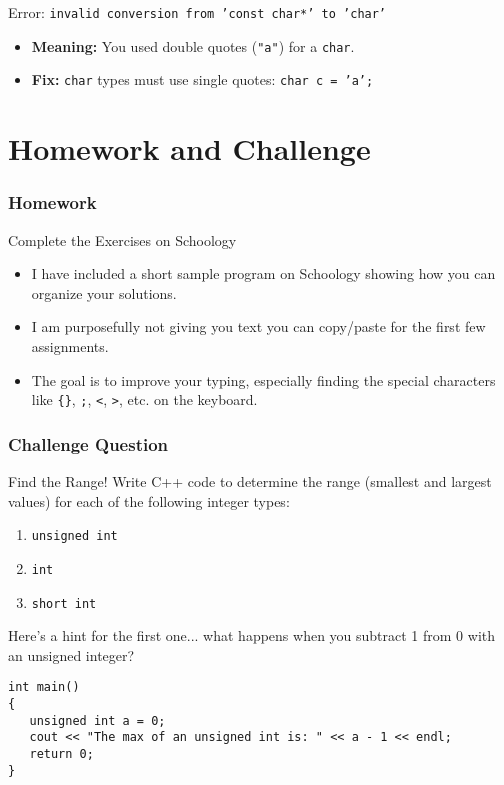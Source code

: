 \documentclass{beamer}
\begin{document}
\begin{frame}
    
\begin{alertblock}{Error: \texttt{invalid conversion from 'const char*' to 'char'}}
\begin{itemize}
    \item \textbf{Meaning:} You used double quotes (\texttt{"a"}) for a \texttt{char}.
    \item \textbf{Fix:} \texttt{char} types must use single quotes: \texttt{char c = 'a';}
\end{itemize}
\end{alertblock}
\end{frame}

\section{Homework and Challenge}

\begin{frame}
\frametitle{Homework}
\begin{block}{Complete the Exercises on Schoology}
\begin{itemize}
    \item I have included a short sample program on Schoology showing how you can organize your solutions.
    \item I am purposefully not giving you text you can copy/paste for the first few assignments.
    \item The goal is to improve your typing, especially finding the special characters like \texttt{\{\}}, \texttt{;}, \texttt{<}, \texttt{>}, etc. on the keyboard.
\end{itemize}
\end{block}
\end{frame}

\begin{frame}[fragile]
\frametitle{Challenge Question}
\begin{exampleblock}{Find the Range!}
Write C++ code to determine the range (smallest and largest values) for each of the following integer types:
\begin{enumerate}
    \item \texttt{unsigned int}
    \item \texttt{int}
    \item \texttt{short int}
\end{enumerate}
Here's a hint for the first one... what happens when you subtract 1 from 0 with an unsigned integer?
\pause
\begin{verbatim}
int main()
{
   unsigned int a = 0;
   cout << "The max of an unsigned int is: " << a - 1 << endl;
   return 0;
}
\end{verbatim}
\end{exampleblock}
\end{frame}
\end{document}
